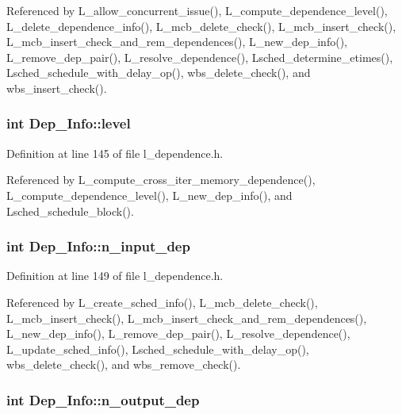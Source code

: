 Referenced by L\_\-allow\_\-concurrent\_\-issue(), L\_\-compute\_\-dependence\_\-level(), L\_\-delete\_\-dependence\_\-info(), L\_\-mcb\_\-delete\_\-check(), L\_\-mcb\_\-insert\_\-check(), L\_\-mcb\_\-insert\_\-check\_\-and\_\-rem\_\-dependences(), L\_\-new\_\-dep\_\-info(), L\_\-remove\_\-dep\_\-pair(), L\_\-resolve\_\-dependence(), Lsched\_\-determine\_\-etimes(), Lsched\_\-schedule\_\-with\_\-delay\_\-op(), wbs\_\-delete\_\-check(), and wbs\_\-insert\_\-check().
\subsubsection{\setlength{\rightskip}{0pt plus 5cm}int \bf{Dep\_\-Info::level}}\label{structDep__Info_2b3b9716f8659a23c5bddeebb852f36e}




Definition at line 145 of file l\_\-dependence.h.

Referenced by L\_\-compute\_\-cross\_\-iter\_\-memory\_\-dependence(), L\_\-compute\_\-dependence\_\-level(), L\_\-new\_\-dep\_\-info(), and Lsched\_\-schedule\_\-block().
\subsubsection{\setlength{\rightskip}{0pt plus 5cm}int \bf{Dep\_\-Info::n\_\-input\_\-dep}}\label{structDep__Info_bdd954afd95eadb9d190dcefc9d69ccc}




Definition at line 149 of file l\_\-dependence.h.

Referenced by L\_\-create\_\-sched\_\-info(), L\_\-mcb\_\-delete\_\-check(), L\_\-mcb\_\-insert\_\-check(), L\_\-mcb\_\-insert\_\-check\_\-and\_\-rem\_\-dependences(), L\_\-new\_\-dep\_\-info(), L\_\-remove\_\-dep\_\-pair(), L\_\-resolve\_\-dependence(), L\_\-update\_\-sched\_\-info(), Lsched\_\-schedule\_\-with\_\-delay\_\-op(), wbs\_\-delete\_\-check(), and wbs\_\-remove\_\-check().
\subsubsection{\setlength{\rightskip}{0pt plus 5cm}int \bf{Dep\_\-Info::n\_\-output\_\-dep}}\label{structDep__Info_ff84d3cffdbbdd362947e3c25adce76e}




